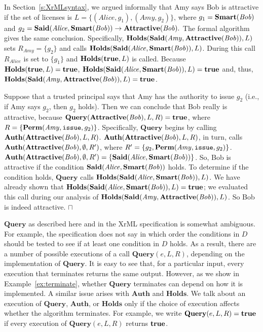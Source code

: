 \documentclass{acmtrans2m}
\newcommand{\xam}{\begin{example}}
\newcommand{\exam}{\bbox\end{example}}
\newcommand{\wbox}{\mbox{$\sqcap$\llap{$\sqcup$}}}
\newcommand{\bbox}{\wbox}
\newcommand{\<}{
}
\renewcommand{\>}{\rangle}
\newcommand{\Att}{\mathit{\bf Attractive}}
\newcommand{\Smart}{\mathit{\bf Smart}}
\newcommand{\Said}{\mathit{\bf Said}}
\newcommand{\true}{\mathit{\bf{true}}}
\newcommand{\Permitted}{\mathit{\bf Perm}}
\newcommand{\cc}{e}
\newcommand{\issue}{\mathtt{issue}}
\newcommand{\imp}{\rightarrow}
\newcommand{\XA}{\textbf{Auth}}
\newcommand{\CMet}{\textbf{Holds}}
\newcommand{\XProc}{\textbf{Query}}
\begin{document}
\begin{sloppypar}
\xam\label{ex:XrML1}
In Section~\ref{s:XrMLsyntax}, we argued informally that Amy says Bob is attractive if the set
of licenses is $L = \{(\mathit{Alice}, g_1), (\mathit{Amy}, g_2)\}$, where
$g_1 = \Smart(\mathit{Bob})$ and
$g_2 = \Said(\mathit{Alice}, \Smart(\mathit{Bob}))\imp\Att(\mathit{Bob}).$  The formal algorithm
gives the same conclusion.  Specifically, $\CMet(\Said(\mathit{Amy}, \Att(\mathit{Bob})), L)$
sets $R_{Amy} = \{g_2\}$ and calls $\CMet(\Said(\mathit{Alice}, \Smart(\mathit{Bob})), L)$.
During this call $R_{Alice}$ is set to $\{g_1\}$ and $\CMet(\true, L)$ is called.  Because
$\CMet(\true, L) = \true$, $\CMet(\Said(\mathit{Alice}, \Smart(\mathit{Bob})), L)
 = \true$ and, thus, $\CMet(\Said(\mathit{Amy}, \Att(\mathit{Bob})), L) = \true$.

Suppose that a trusted principal says that Amy has the authority to issue $g_2$ (i.e., if Amy
says $g_2$, then $g_2$ holds).  Then we can conclude that Bob really is attractive, because
$\XProc(\Att(\mathit{Bob}), L, R) = \true$, where $R = \{\Permitted(\mathit{Amy}, \issue, g_2)\}$.
Specifically, $\XProc$ begins by calling $\XA(\Att(\mathit{Bob}), L, R)$.
$\XA(\Att(\mathit{Bob}), L, R)$, in turn, calls $\XA(\Att(\mathit{Bob}), \emptyset, R')$, where
$R' = \{g_2, \Permitted(\mathit{Amy}, \issue, g_2)\}$.
$\XA(\Att(\mathit{Bob}), \emptyset, R') = \{\Said(\mathit{Alice}, \Smart(\mathit{Bob}))\}$.  So,
Bob is attractive if the condition $\Said(\mathit{Alice}, \Smart(\mathit{Bob}))$ holds.  To
determine if the condition holds, $\XProc$ calls
$\CMet(\Said(\mathit{Alice}, \Smart(\mathit{Bob})), L)$.  We have already shown that
$\CMet(\Said(\mathit{Alice}, \Smart(\mathit{Bob})), L) = \true$; we evaluated this call during our
analysis of $\CMet(\Said(\mathit{Amy}, \Att(\mathit{Bob})), L)$.  So Bob is indeed attractive.
\exam
\end{sloppypar}

$\XProc$ as described here and in the XrML specification is somewhat ambiguous.  For example,
the specification does not say in which order the conditions in $D$ should be tested to see if at
least one condition in $D$ holds.  As a result, there are a number of possible executions of a call
$\XProc(\cc, L, R)$, depending on the implementation of $\XProc$.  It is easy to see that, for a
particular input, every execution that terminates returns the same output.  However, as we show in
Example~\ref{ex:terminate}, whether $\XProc$ terminates can depend on how it is implemented.  A
similar issue arises with $\XA$ and $\CMet$.  We talk about an execution of $\XProc$, $\XA$, or
$\CMet$ only if the choice of execution affects whether the algorithm terminates.  For example, we
write $\XProc(\cc, L, R) = \true$ if every execution of $\XProc(\cc, L, R)$ returns $\true$.
\end{document}

